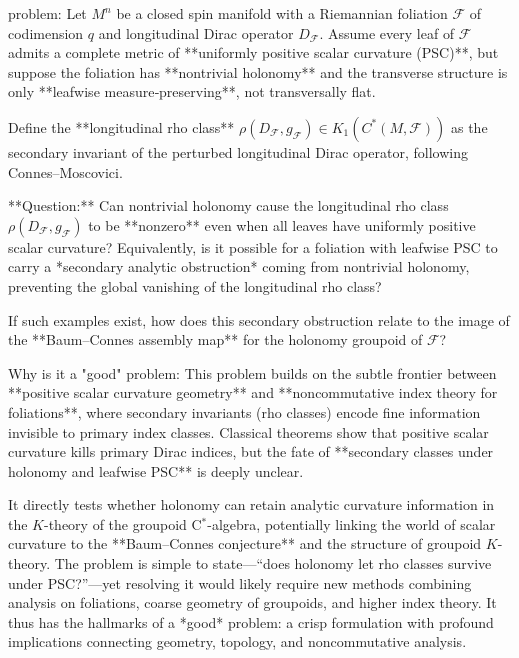 problem:  
Let \(M^n\) be a closed spin manifold with a Riemannian foliation \(\mathcal{F}\) of codimension \(q\) and longitudinal Dirac operator \(D_\mathcal{F}\). Assume every leaf of \(\mathcal{F}\) admits a complete metric of **uniformly positive scalar curvature (PSC)**, but suppose the foliation has **nontrivial holonomy** and the transverse structure is only **leafwise measure‑preserving**, not transversally flat.  

Define the **longitudinal rho class** \(\rho(D_\mathcal{F},g_\mathcal{F})\in K_1(C^*(M,\mathcal{F}))\) as the secondary invariant of the perturbed longitudinal Dirac operator, following Connes–Moscovici.  

**Question:**  
Can nontrivial holonomy cause the longitudinal rho class \(\rho(D_\mathcal{F},g_\mathcal{F})\) to be **nonzero** even when all leaves have uniformly positive scalar curvature?  
Equivalently, is it possible for a foliation with leafwise PSC to carry a *secondary analytic obstruction* coming from nontrivial holonomy, preventing the global vanishing of the longitudinal rho class?  

If such examples exist, how does this secondary obstruction relate to the image of the **Baum–Connes assembly map** for the holonomy groupoid of \(\mathcal{F}\)?  

Why is it a "good" problem:  
This problem builds on the subtle frontier between **positive scalar curvature geometry** and **noncommutative index theory for foliations**, where secondary invariants (rho classes) encode fine information invisible to primary index classes. Classical theorems show that positive scalar curvature kills primary Dirac indices, but the fate of **secondary classes under holonomy and leafwise PSC** is deeply unclear.  

It directly tests whether holonomy can retain analytic curvature information in the \(K\)-theory of the groupoid C\(^*\)-algebra, potentially linking the world of scalar curvature to the **Baum–Connes conjecture** and the structure of groupoid \(K\)-theory. The problem is simple to state—“does holonomy let rho classes survive under PSC?”—yet resolving it would likely require new methods combining analysis on foliations, coarse geometry of groupoids, and higher index theory. It thus has the hallmarks of a *good* problem: a crisp formulation with profound implications connecting geometry, topology, and noncommutative analysis.
